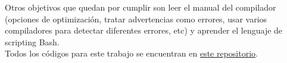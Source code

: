 \documentclass[a4paper,12pt]{article}
\begin{document}
Otros objetivos que quedan por cumplir son leer el manual del compilador (opciones de optimización, tratar advertencias como errores, usar varios compiladores para detectar diferentes errores, etc) y aprender el lenguaje de scripting Bash.\\

Todos los códigos para este trabajo se encuentran en \href{https://github.com/santigiordani/labo-4}{este repositorio}.




\end{document}
